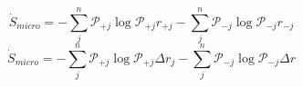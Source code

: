 \begin{equation}
\dot S_{micro} = -\sum_j^n\mathcal P_{+j}\log\mathcal P_{+j}r_{+j} -\sum_j^n\mathcal P_{-j}\log\mathcal P_{-j} r_{-j}
\end{equation}
\begin{equation}
\dot S_{micro} = -\sum_j^n\mathcal P_{+j}\log\mathcal P_{+j}\Delta r_j -\sum_j^n\mathcal P_{-j}\log\mathcal P_{-j} \Delta r
\end{equation}